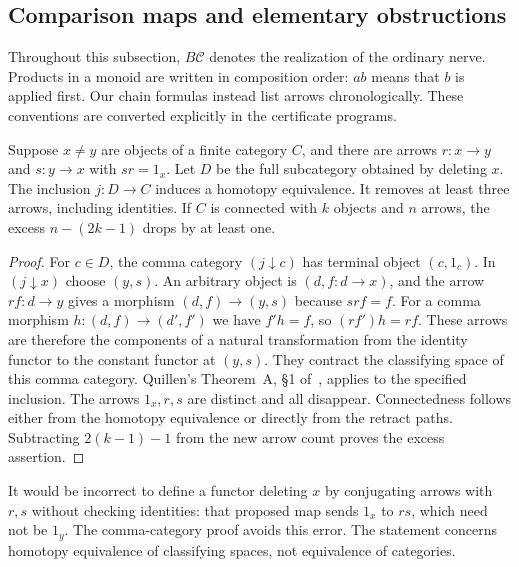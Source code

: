 \subsection{Comparison maps and elementary obstructions}

Throughout this subsection, $B\mathcal C$ denotes the realization of the
ordinary nerve. Products in a monoid are written in composition order:
$ab$ means that $b$ is applied first. Our chain formulas instead list
arrows chronologically. These conventions are converted explicitly in
the certificate programs.

\begin{lemma}
\label{CP2:A-retract-deletion}
Suppose $x\ne y$ are objects of a finite category $C$, and there are
arrows $r:x\to y$ and $s:y\to x$ with $sr=1_x$. Let $D$ be the full
subcategory obtained by deleting $x$. The inclusion $j:D\to C$ induces
a homotopy equivalence. It removes at least three arrows, including
identities. If $C$ is connected with $k$ objects and $n$ arrows, the
excess $n-(2k-1)$ drops by at least one.
\end{lemma}
\begin{proof}
For $c\in D$, the comma category $(j\downarrow c)$ has terminal object
$(c,1_c)$. In $(j\downarrow x)$ choose $(y,s)$. An arbitrary object is
$(d,f:d\to x)$, and the arrow $rf:d\to y$ gives a morphism
$(d,f)\to(y,s)$ because $srf=f$. For a comma morphism
$h:(d,f)\to(d',f')$ we have $f'h=f$, so $(rf')h=rf$. These arrows
are therefore the components of a natural transformation from the
identity functor to the constant functor at $(y,s)$. They contract the
classifying space of this comma category. Quillen's Theorem~A,
\S1 of~\cite{CP2-Quillen1973}, applies to the specified inclusion.
The arrows $1_x,r,s$ are distinct and all disappear. Connectedness
follows either from the homotopy equivalence or directly from the
retract paths. Subtracting $2(k-1)-1$ from the new arrow count proves
the excess assertion.
\end{proof}

\begin{remark*}
It would be incorrect to define a functor deleting $x$ by conjugating
arrows with $r,s$ without checking identities: that proposed map sends
$1_x$ to $rs$, which need not be $1_y$. The comma-category proof avoids
this error. The statement concerns homotopy equivalence of classifying
spaces, not equivalence of categories.
\end{remark*}

